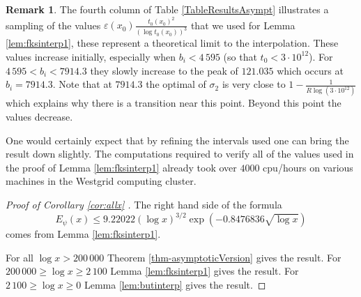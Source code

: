 \documentclass[10pt]{amsart}
\theoremstyle{definition}
\newtheorem{Rem}[prop]{Remark}
\numberwithin{equation}{section}
\begin{document}
\begin{Rem}
The fourth column of Table \ref{TableResultsAsympt} illustrates a sampling of the values  $ \varepsilon(x_0)  \tfrac{t_0(x_0)^2}{(\log t_0(x_0))^3}$ that we used for Lemma \ref{lem:fksinterp1}, these represent a theoretical limit to the interpolation.
These values increase initially, especially when $b_i<4\,595$ (so that $t_0<3\cdot10^{12}$). For  $4\,595 <b_i < 7914.3$ they slowly increase to the peak of $121.035$ which occurs at $b_i=7914.3$.
 Note that at $7914.3$ the optimal of $\sigma_2$ is very close to $1-\frac{1}{R\log(3\cdot10^{12})}$ which explains why there is a transition near this point.
 Beyond this point the values decrease.

One would certainly expect that by refining the intervals used one can bring the result down slightly. The computations required to verify all of the values used in the proof of Lemma \ref{lem:fksinterp1} already took over $4000$ cpu/hours on various machines in the Westgrid computing cluster.
\end{Rem}


\begin{proof}[Proof of Corollary \ref{cor:allx} ]
The right hand side of the formula
\[    E_{\psi}(x)  \le  9.22022(\log x)^{3/2}\exp(-0.8476836\sqrt{\log x}) \]
comes from  Lemma \ref{lem:fksinterp1}.

For all $\log x > 200\,000$ Theorem \ref{thm-asymptoticVersion} gives the result. 
For $200\,000 \ge \log x \ge 2\,100$ Lemma \ref{lem:fksinterp1} gives the result.
For $2\,100 \ge \log x \ge 0$ Lemma \ref{lem:butinterp} gives the result.
\end{proof}
\end{document}
